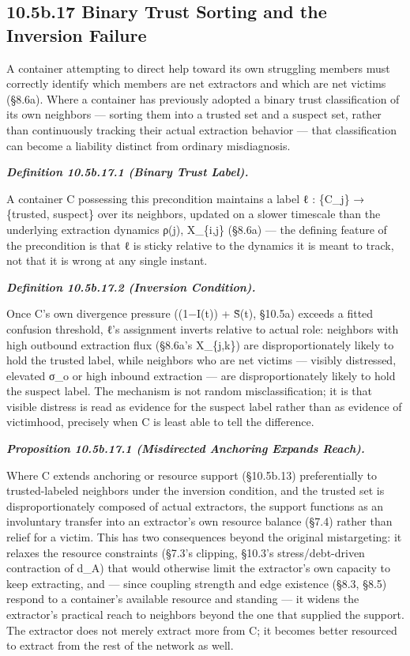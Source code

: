 \documentclass[
]{article}
\begin{document}
\hypertarget{b.17-binary-trust-sorting-and-the-inversion-failure}{%
\subsection{10.5b.17 Binary Trust Sorting and the Inversion
Failure}\label{b.17-binary-trust-sorting-and-the-inversion-failure}}

A container attempting to direct help toward its own struggling members
must correctly identify which members are net extractors and which are
net victims (§8.6a). Where a container has previously adopted a binary
trust classification of its own neighbors --- sorting them into a
trusted set and a suspect set, rather than continuously tracking their
actual extraction behavior --- that classification can become a
liability distinct from ordinary misdiagnosis.

\emph{\textbf{Definition 10.5b.17.1 (Binary Trust Label).}}

A container C possessing this precondition maintains a label ℓ :
\{C\_j\} → \{trusted, suspect\} over its neighbors, updated on a slower
timescale than the underlying extraction dynamics ρ(j), X\_\{i,j\}
(§8.6a) --- the defining feature of the precondition is that ℓ is sticky
relative to the dynamics it is meant to track, not that it is wrong at
any single instant.

\emph{\textbf{Definition 10.5b.17.2 (Inversion Condition).}}

Once C's own divergence pressure ((1−I(t)) + S̃(t), §10.5a) exceeds a
fitted confusion threshold, ℓ's assignment inverts relative to actual
role: neighbors with high outbound extraction flux (§8.6a's X\_\{j,k\})
are disproportionately likely to hold the trusted label, while neighbors
who are net victims --- visibly distressed, elevated σ\_o or high
inbound extraction --- are disproportionately likely to hold the suspect
label. The mechanism is not random misclassification; it is that visible
distress is read as evidence for the suspect label rather than as
evidence of victimhood, precisely when C is least able to tell the
difference.

\emph{\textbf{Proposition 10.5b.17.1 (Misdirected Anchoring Expands
Reach).}}

Where C extends anchoring or resource support (§10.5b.13) preferentially
to trusted-labeled neighbors under the inversion condition, and the
trusted set is disproportionately composed of actual extractors, the
support functions as an involuntary transfer into an extractor's own
resource balance (§7.4) rather than relief for a victim. This has two
consequences beyond the original mistargeting: it relaxes the resource
constraints (§7.3's clipping, §10.3's stress/debt-driven contraction of
d\_A) that would otherwise limit the extractor's own capacity to keep
extracting, and --- since coupling strength and edge existence (§8.3,
§8.5) respond to a container's available resource and standing --- it
widens the extractor's practical reach to neighbors beyond the one that
supplied the support. The extractor does not merely extract more from C;
it becomes better resourced to extract from the rest of the network as
well.
\end{document}
